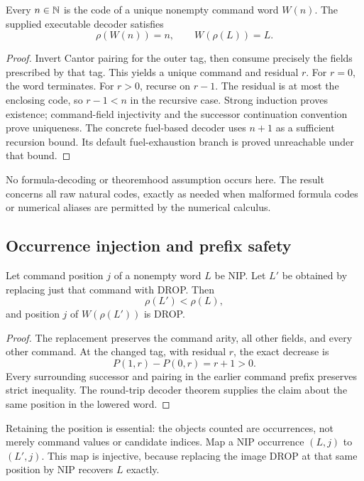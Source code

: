 \begin{lemma}
Every $n\in\mathbb{N}$ is the code of a unique nonempty command word $W(n)$.
The supplied executable decoder satisfies
\[
 \rho(W(n))=n,\qquad W(\rho(L))=L.
\]
\end{lemma}
\begin{proof}
Invert Cantor pairing for the outer tag, then consume precisely the fields
prescribed by that tag. This yields a unique command and residual $r$.
For $r=0$, the word terminates. For $r>0$, recurse on $r-1$.
The residual is at most the enclosing code, so $r-1<n$ in the recursive
case. Strong induction proves existence; command-field injectivity and
the successor continuation convention prove uniqueness. The concrete
fuel-based decoder uses $n+1$ as a sufficient recursion bound. Its default
fuel-exhaustion branch is proved unreachable under that bound.
\end{proof}

No formula-decoding or theoremhood assumption occurs here. The result
concerns all raw natural codes, exactly as needed when malformed formula
codes or numerical aliases are permitted by the numerical calculus.

\subsection{Occurrence injection and prefix safety}

\begin{theorem}
Let command position $j$ of a nonempty word $L$ be NIP. Let $L'$ be
obtained by replacing just that command with DROP. Then
\[
 \rho(L')<\rho(L),
\]
and position $j$ of $W(\rho(L'))$ is DROP.
\end{theorem}
\begin{proof}
The replacement preserves the command arity, all other fields, and every other
command. At the changed tag, with residual $r$, the exact decrease is
\[
 P(1,r)-P(0,r)=r+1>0.
\]
Every surrounding successor and pairing in the earlier command prefix
preserves strict inequality. The round-trip decoder theorem supplies the
claim about the same position in the lowered word.
\end{proof}

Retaining the position is essential: the objects counted are occurrences,
not merely command values or candidate indices. Map a NIP occurrence
$(L,j)$ to $(L',j)$. This map is injective, because replacing the image
DROP at that same position by NIP recovers $L$ exactly.

